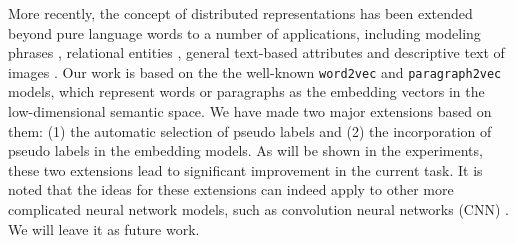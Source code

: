 More recently, the concept of distributed representations has been extended beyond pure language words to a number of applications, including modeling  phrases \cite{phrases}, relational entities \cite{entity1,entity2}, general text-based attributes \cite{attribute} and descriptive text of images \cite{image}.  Our work is based on the the well-known \texttt{word2vec} \cite{word_to_vector} and \texttt{paragraph2vec} \cite{paragraph_vector} models, which represent words or paragraphs as the embedding vectors in the low-dimensional semantic space. We have made two major extensions based on them: (1) the automatic selection of pseudo labels and (2) the incorporation of pseudo labels in the embedding models.  As will be shown in the experiments, these two extensions lead to significant improvement in the current task. It is noted that the ideas for these extensions can indeed apply to other more complicated neural network models, such as convolution neural networks (CNN) \cite{CNN}.
We will leave it as future work.
